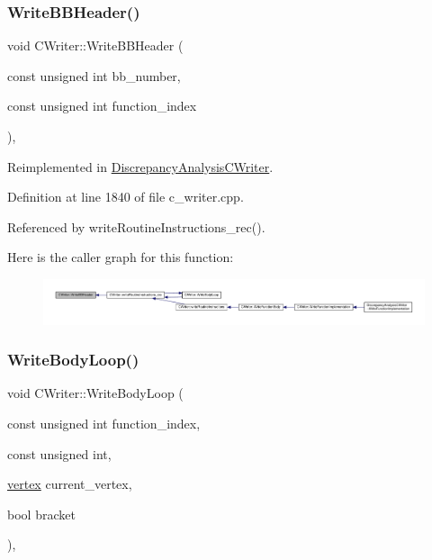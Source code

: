 \subsubsection{\texorpdfstring{Write\+B\+B\+Header()}{WriteBBHeader()}}
{\footnotesize\ttfamily void C\+Writer\+::\+Write\+B\+B\+Header (\begin{DoxyParamCaption}\item[{const unsigned int}]{bb\+\_\+number,  }\item[{const unsigned int}]{function\+\_\+index }\end{DoxyParamCaption})\hspace{0.3cm}{\ttfamily [protected]}, {\ttfamily [virtual]}}



Reimplemented in \hyperlink{classDiscrepancyAnalysisCWriter_aa06e1b8c2dedbdb1278f61c7970ebc62}{Discrepancy\+Analysis\+C\+Writer}.



Definition at line 1840 of file c\+\_\+writer.\+cpp.



Referenced by write\+Routine\+Instructions\+\_\+rec().

Here is the caller graph for this function\+:
\nopagebreak
\begin{figure}[H]
\begin{center}
\leavevmode
\includegraphics[width=350pt]{d3/d59/classCWriter_a60ced6c07b4f41a09acdae409615e24e_icgraph}
\end{center}
\end{figure}
\mbox{\label{classCWriter_a37dbe13948ff32204ff5030b9400ec84}} 
\subsubsection{\texorpdfstring{Write\+Body\+Loop()}{WriteBodyLoop()}}
{\footnotesize\ttfamily void C\+Writer\+::\+Write\+Body\+Loop (\begin{DoxyParamCaption}\item[{const unsigned int}]{function\+\_\+index,  }\item[{const unsigned}]{int,  }\item[{\hyperlink{graph_8hpp_abefdcf0544e601805af44eca032cca14}{vertex}}]{current\+\_\+vertex,  }\item[{bool}]{bracket }\end{DoxyParamCaption})\hspace{0.3cm}{\ttfamily [protected]}, {\ttfamily [virtual]}}



